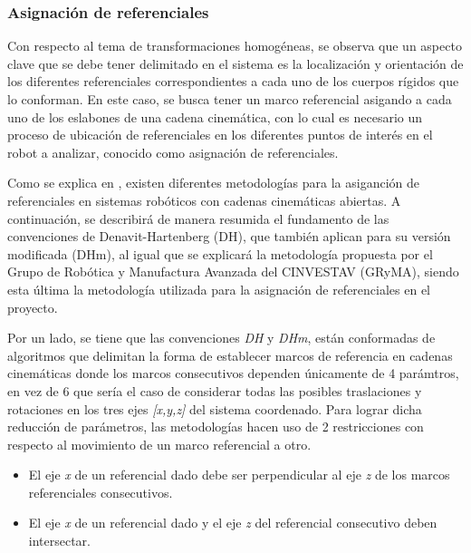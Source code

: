     \subsubsection{Asignación de referenciales}
        \noindent Con respecto al tema de transformaciones homogéneas, se observa que un 
        aspecto clave que se debe tener delimitado en el sistema es la localización 
        y orientación de los diferentes referenciales correspondientes a cada uno de 
        los cuerpos rígidos que lo conforman. En este caso, se busca tener un marco 
        referencial asigando a cada uno de los eslabones de una cadena cinemática, con lo cual es 
        necesario un proceso de ubicación de referenciales en los diferentes 
        puntos de interés en el robot a analizar, conocido como asignación de referenciales.

        Como se explica en \cite{3DMotion}, existen diferentes metodologías para la asiganción 
        de referenciales en sistemas robóticos con cadenas cinemáticas abiertas. A 
        continuación, se describirá de manera resumida el fundamento de las convenciones de 
        Denavit-Hartenberg (DH), que también aplican para su versión modificada (DHm), 
        al igual que se explicará la metodología propuesta por el Grupo de Robótica y 
        Manufactura Avanzada del CINVESTAV (GRyMA), siendo esta última la metodología 
        utilizada para la asignación de referenciales en el proyecto.

        Por un lado, se tiene que las convenciones \emph{DH} y \emph{DHm}, están conformadas 
        de algoritmos que delimitan la forma de establecer marcos de referencia en 
        cadenas cinemáticas donde los marcos consecutivos dependen únicamente de 4 parámtros, 
        en vez de 6 que sería el caso de considerar todas las posibles traslaciones y rotaciones 
        en los tres ejes \emph{[x,y,z]} del sistema coordenado. Para lograr dicha reducción de 
        parámetros, las metodologías hacen uso de 2 restricciones con respecto al movimiento de 
        un marco referencial a otro.

        \begin{itemize}
            \item El eje \emph{x} de un referencial dado debe ser perpendicular al eje \emph{z} de los marcos referenciales consecutivos.
            \item El eje \emph{x} de un referencial dado y el eje \emph{z} del referencial consecutivo deben intersectar.
        \end{itemize}

